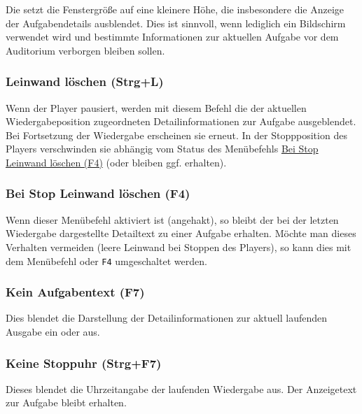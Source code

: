 \documentclass[a4paper,DIV=11
]{scrartcl}
\begin{document}
Die setzt die Fenstergröße auf eine kleinere Höhe, die insbesondere die
Anzeige der Aufgabendetails ausblendet. Dies ist sinnvoll, wenn
lediglich ein Bildschirm verwendet wird und bestimmte Informationen zur
aktuellen Aufgabe vor dem Auditorium verborgen bleiben sollen.

\hypertarget{leinwand-luxf6schen-strgl}{%
\subsubsection{Leinwand löschen
(Strg+L)}\label{leinwand-luxf6schen-strgl}}

Wenn der Player pausiert, werden mit diesem Befehl die der aktuellen
Wiedergabeposition zugeordneten Detailinformationen zur Aufgabe
ausgeblendet. Bei Fortsetzung der Wiedergabe erscheinen sie erneut. In
der Stoppposition des Players verschwinden sie abhängig vom Status des
Menübefehls \protect\hyperlink{BeiStopLeinwandLoeschen}{Bei Stop
Leinwand löschen (F4)} (oder bleiben ggf. erhalten).

\hypertarget{bei-stop-leinwand-luxf6schen-f4}{%
\subsubsection{Bei Stop Leinwand löschen
(F4)}\label{bei-stop-leinwand-luxf6schen-f4}}

Wenn dieser Menübefehl aktiviert ist (angehakt), so bleibt der bei der
letzten Wiedergabe dargestellte Detailtext zu einer Aufgabe erhalten.
Möchte man dieses Verhalten vermeiden (leere Leinwand bei Stoppen des
Players), so kann dies mit dem Menübefehl oder \texttt{F4} umgeschaltet
werden.

\hypertarget{kein-aufgabentext-f7}{%
\subsubsection{Kein Aufgabentext (F7)}\label{kein-aufgabentext-f7}}

Dies blendet die Darstellung der Detailinformationen zur aktuell
laufenden Ausgabe ein oder aus.

\hypertarget{keine-stoppuhr-strgf7}{%
\subsubsection{Keine Stoppuhr (Strg+F7)}\label{keine-stoppuhr-strgf7}}

Dieses blendet die Uhrzeitangabe der laufenden Wiedergabe aus. Der
Anzeigetext zur Aufgabe bleibt erhalten.
\end{document}
